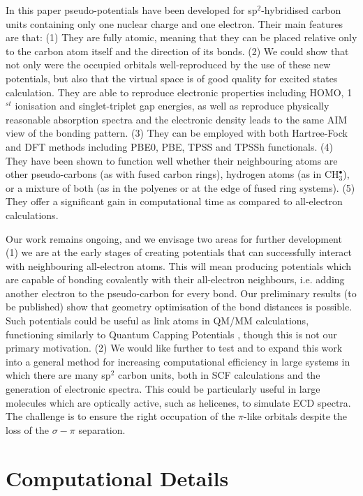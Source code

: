 \documentclass[12pt]{article}
\begin{document}
In this paper pseudo-potentials have been developed for sp$^{2}$-hybridised carbon units containing only one nuclear charge and one electron. 
Their main features are that: 
(1) They are fully atomic, meaning that they can be placed relative only to the carbon atom itself and the direction of its bonds. 
(2) We could show that not only were the occupied orbitals well-reproduced by the use of these new potentials, but also that the virtual space is of good quality for excited states calculation. 
They are able to reproduce electronic properties including HOMO, 1$^{st}$ ionisation and singlet-triplet gap energies, as well as reproduce physically reasonable absorption spectra and the electronic
density leads to the same AIM view of the bonding pattern.
(3) They can be employed with both Hartree-Fock and DFT methods including PBE0, PBE, TPSS and TPSSh functionals. 
(4) They have been shown to function well whether their neighbouring atoms are other pseudo-carbons (as with fused carbon rings), hydrogen atoms (as in CH\(^{\bullet}_{3}\)),
or a mixture of both (as in the polyenes or at the edge of fused ring systems). 
(5) They offer a significant gain in computational time as compared to all-electron calculations.

Our work remains ongoing, and we envisage two areas for further development
(1) we are at the early stages of creating potentials that can successfully interact with neighbouring all-electron atoms.
This will mean producing potentials which are capable of bonding covalently with their all-electron neighbours, i.e. adding another electron to the pseudo-carbon for every bond.
Our preliminary results (to be published) show that geometry optimisation of the bond distances is possible.
Such potentials could be useful as link atoms in QM/MM calculations, functioning similarly to Quantum Capping Potentials \cite{dilabio_simple_2002},
though this is not our primary motivation.
(2) We would like further to test and to expand this work into a general method for increasing computational efficiency in large systems in
which there are many sp$^{2}$ carbon units, both in SCF calculations and the generation of electronic spectra.
This could be particularly useful in large molecules which are optically active, such as helicenes, to simulate ECD spectra.
The challenge is to ensure the right occupation of the $\pi$-like orbitals despite the loss of the
$\sigma-\pi$ separation.

\section*{\sffamily \large Computational Details}
\end{document}
